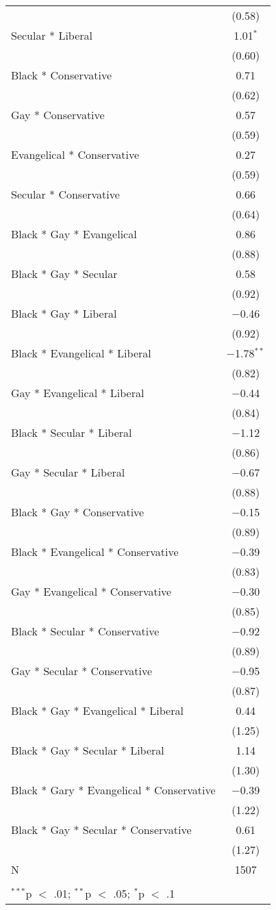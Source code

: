 \begin{table}[!htbp]
\begin{tabular}{@{\extracolsep{5pt}}lc}
  & (0.58) \\ 
  Secular * Liberal & 1.01$^{*}$ \\ 
  & (0.60) \\ 
  Black * Conservative & 0.71 \\ 
  & (0.62) \\ 
  Gay * Conservative & 0.57 \\ 
  & (0.59) \\ 
  Evangelical * Conservative & 0.27 \\ 
  & (0.59) \\ 
  Secular * Conservative & 0.66 \\ 
  & (0.64) \\ 
  Black * Gay * Evangelical & 0.86 \\ 
  & (0.88) \\ 
  Black * Gay * Secular & 0.58 \\ 
  & (0.92) \\ 
  Black * Gay * Liberal & $-$0.46 \\ 
  & (0.92) \\ 
  Black * Evangelical * Liberal & $-$1.78$^{**}$ \\ 
  & (0.82) \\ 
  Gay * Evangelical * Liberal & $-$0.44 \\ 
  & (0.84) \\ 
  Black * Secular * Liberal & $-$1.12 \\ 
  & (0.86) \\ 
  Gay * Secular * Liberal & $-$0.67 \\ 
  & (0.88) \\ 
  Black * Gay * Conservative & $-$0.15 \\ 
  & (0.89) \\ 
  Black * Evangelical * Conservative & $-$0.39 \\ 
  & (0.83) \\ 
  Gay * Evangelical  * Conservative & $-$0.30 \\ 
  & (0.85) \\ 
  Black * Secular * Conservative & $-$0.92 \\ 
  & (0.89) \\ 
  Gay * Secular * Conservative & $-$0.95 \\ 
  & (0.87) \\ 
  Black * Gay * Evangelical * Liberal & 0.44 \\ 
  & (1.25) \\ 
  Black * Gay * Secular * Liberal & 1.14 \\ 
  & (1.30) \\ 
  Black * Gary * Evangelical * Conservative & $-$0.39 \\ 
  & (1.22) \\ 
  Black * Gay * Secular * Conservative & 0.61 \\ 
  & (1.27) \\ 
 N & 1507 \\ 
\hline \\[-1.8ex] 
\multicolumn{2}{l}{$^{***}$p $<$ .01; $^{**}$p $<$ .05; $^{*}$p $<$ .1} \\ 
\end{tabular} 
\end{table} 

